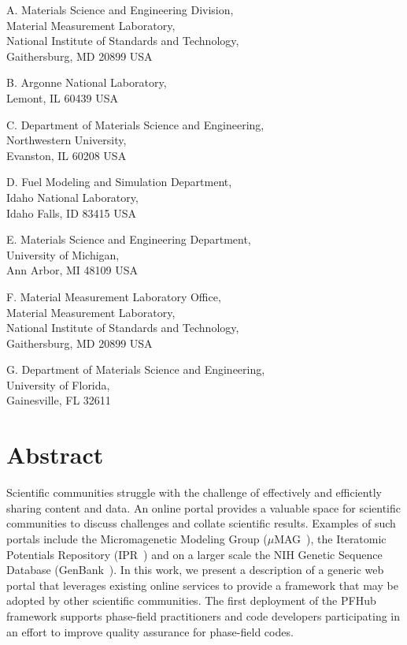 \documentclass{jors}
\begin{document}
A. Materials Science and Engineering Division, \\
Material Measurement Laboratory, \\
National Institute of Standards and Technology,\\
Gaithersburg, MD 20899 USA

B. Argonne National Laboratory, \\
Lemont, IL 60439 USA

C. Department of Materials Science and Engineering, \\
Northwestern University, \\
Evanston, IL 60208 USA

D. Fuel Modeling and Simulation Department, \\
Idaho National Laboratory, \\
Idaho Falls, ID 83415 USA

E. Materials Science and Engineering Department, \\
University of Michigan, \\
Ann Arbor, MI 48109 USA

F. Material Measurement Laboratory Office, \\
Material Measurement Laboratory, \\
National Institute of Standards and Technology,\\
Gaithersburg, MD 20899 USA

G. Department of Materials Science and Engineering, \\
University of Florida, \\
Gainesville, FL 32611

\section*{Abstract}

Scientific communities struggle with the challenge of effectively and
efficiently sharing content and data. An online portal provides a
valuable space for scientific communities to discuss challenges and
collate scientific results. Examples of such portals include the
Micromagenetic Modeling Group ($\mu$MAG~\cite{mumag}), the Iteratomic
Potentials Repository (IPR~\cite{ipr1, ipr2}) and on a larger scale
the NIH Genetic Sequence Database (GenBank~\cite{genbank}). In this
work, we present a description of a generic web portal that leverages
existing online services to provide a framework that may be adopted by
other scientific communities. The first deployment of the PFHub
framework supports phase-field practitioners and code developers
participating in an effort to improve quality assurance for
phase-field codes.
\end{document}
